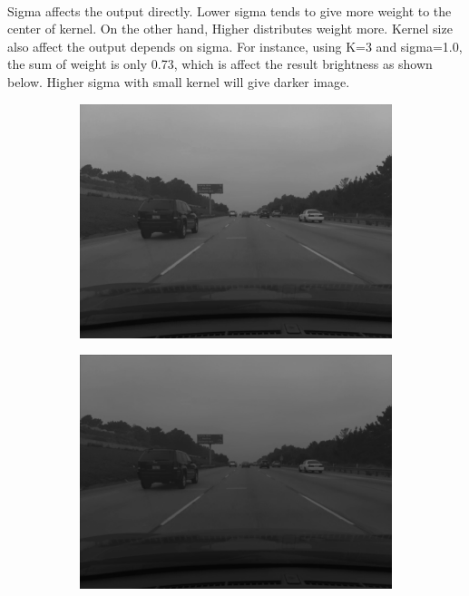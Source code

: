 \documentclass[12pt,a4paper]{report}
\begin{document}
\paragraph*{}
Sigma affects the output directly. Lower sigma tends to give more weight to the center of kernel. On the other hand, Higher distributes weight more. Kernel size also affect the output depends on sigma. For instance, using K=3 and sigma=1.0, the sum of weight is only 0.73, which is affect the result brightness as shown below. Higher sigma with small kernel will give darker image.
\begin{figure}[!htb]
  \begin{minipage}{\linewidth}
    \centering
    \begin{subfigure}{0.49\textwidth}
      \includegraphics[width=\linewidth]{output/img2_q1_K3_SIG_0.5.png}
    \end{subfigure}
    \begin{subfigure}{0.49\textwidth}
      \includegraphics[width=\linewidth]{output/img2_q1_K3_SIG_1.0.png}
    \end{subfigure}
    


\end{minipage}
\end{figure}
\end{document}
